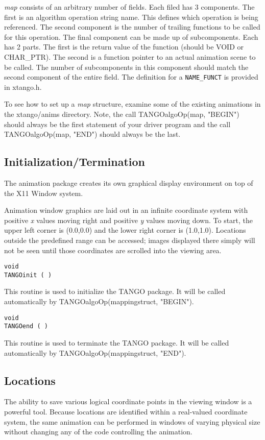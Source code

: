{\em map} consists of an arbitrary number of fields.  Each filed has 3
components.  The first is an algorithm operation string name.  This
defines which operation is being referenced.  The second component is
the number of trailing functions to be called for this operation.  The
final component can be made up of subcomponents.  Each has 2 parts.
The first is the return value of the function (should be VOID or
CHAR\_PTR).  The second is a function pointer to an actual animation
scene to be called.  The number of subcomponents in this component
should match the second component of the entire field.  The definition
for a {\tt NAME\_FUNCT} is provided in xtango.h.

To see how to set up a {\em map} structure, examine some of the
existing animations in the xtango/anims directory.  Note, the call
TANGOalgoOp(map, "BEGIN") should always be the first statement of your
driver program and the call TANGOalgoOp(map, "END") should always be
the last. 

\subsection{Initialization/Termination}
The animation package creates its own graphical display environment on top 
of the X11 Window system.

Animation window graphics are laid out in an infinite coordinate system with
positive {\em x} values moving right and positive {\em y} values moving down.
To start, the upper left corner is (0.0,0.0) and the lower right corner is
(1.0,1.0).  Locations outside the predefined range can be accessed; images
displayed there simply will not be seen until those coordinates are scrolled
into the viewing area.

\vspace{1em}
\begin{verbatim}
void
TANGOinit ( )
\end{verbatim}
This routine is used to initialize the TANGO package.  It will be called
automatically by TANGOalgoOp(mappingstruct, "BEGIN").

\vspace{1em}
\begin{verbatim}
void
TANGOend ( )
\end{verbatim}
This routine is used to terminate the TANGO package.  It will be called
automatically by TANGOalgoOp(mappingstruct, "END").

\subsection{Locations}
The ability to save various logical coordinate points in the viewing window
is a powerful tool.  Because locations are identified within a real-valued
coordinate system, the same animation can be performed in windows of varying
physical size without changing any of the code controlling the animation.

